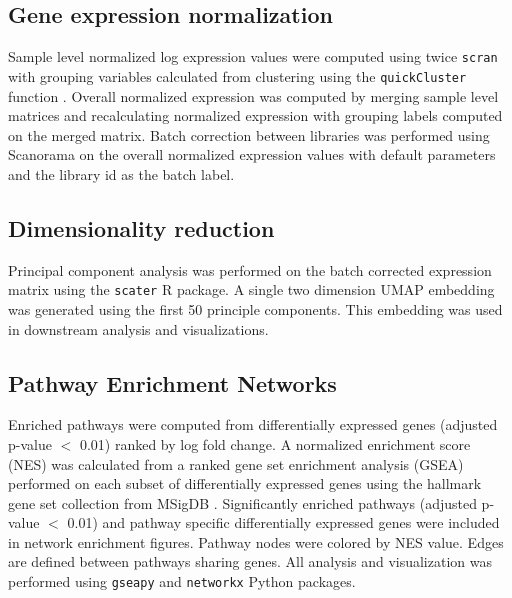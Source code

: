 \subsection{Gene expression normalization}

Sample level normalized log expression values were computed using twice \texttt{scran} \cite{lun2016pooling} with grouping variables calculated from clustering using the \texttt{quickCluster} function \cite{lun2016step}. Overall normalized expression was computed by merging sample level matrices and recalculating normalized expression with grouping labels computed on the merged matrix. Batch correction between libraries was performed using Scanorama \cite{hie2019efficient} on the overall normalized expression values with default parameters and the library id as the batch label.

\subsection{Dimensionality reduction}

Principal component analysis was performed on the batch corrected expression matrix using the \texttt{scater} \cite{mccarthy2017scater} R package. A single two dimension UMAP \cite{becht2019dimensionality} embedding was generated using the first 50 principle components. This embedding was used in downstream analysis and visualizations.

\subsection{Pathway Enrichment Networks}

Enriched pathways were computed from differentially expressed genes (adjusted p-value $<$ 0.01) ranked by log fold change.  A normalized enrichment score (NES) was calculated from a ranked gene set enrichment analysis (GSEA) \cite{shi2007gene} performed on each subset of differentially expressed genes using the hallmark gene set collection from MSigDB \cite{liberzon2015molecular}.  Significantly enriched pathways (adjusted p-value $<$ 0.01) and pathway specific differentially expressed genes were included in network enrichment figures.  
Pathway nodes were colored by NES value. Edges are defined between pathways sharing genes.
All analysis and visualization was performed using \texttt{gseapy} and \texttt{networkx} \cite{hagberg2008exploring} Python packages.

